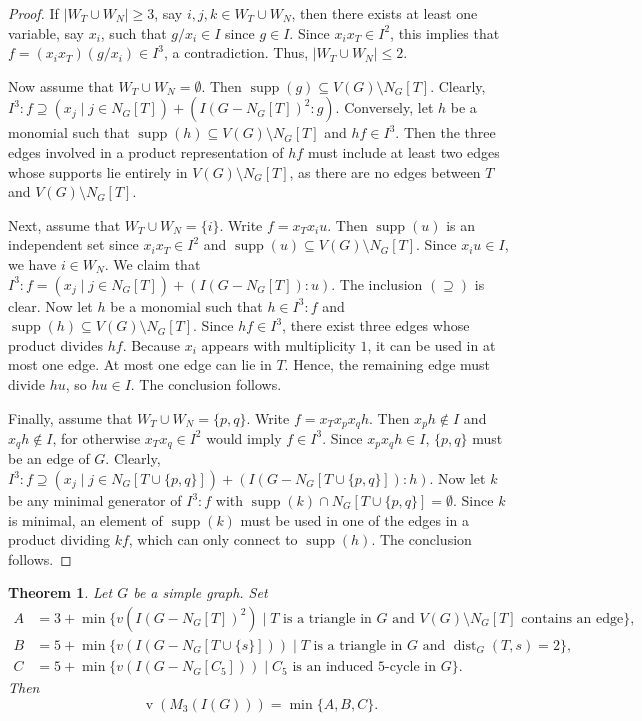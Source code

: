 \documentclass[12pt]{amsart}
\def\v{\operatorname{v}}
\newtheorem{theorem}[lemma]{Theorem}
\begin{document}
\begin{proof} 
If $|W_T \cup W_N| \ge 3$, say $i, j, k \in W_T \cup W_N$, then there exists at least one variable, say $x_i$, such that $g / x_i \in I$ since $g \in I$. Since $x_i x_T \in I^2$, this implies that $f = (x_i x_T) (g / x_i) \in I^3$, a contradiction. Thus, $|W_T \cup W_N| \le 2$.

Now assume that $W_T \cup W_N = \emptyset$. Then $\operatorname{supp}(g) \subseteq V(G) \setminus N_G[T]$. Clearly, $I^3 : f \supseteq (x_j \mid j \in N_G[T]) + (I(G - N_G[T])^2 : g)$. Conversely, let $h$ be a monomial such that $\operatorname{supp}(h) \subseteq V(G) \setminus N_G[T]$ and $h f \in I^3$. Then the three edges involved in a product representation of $h f$ must include at least two edges whose supports lie entirely in $V(G) \setminus N_G[T]$, as there are no edges between $T$ and $V(G) \setminus N_G[T]$.

Next, assume that $W_T \cup W_N = \{i\}$. Write $f = x_T x_i u$. Then $\operatorname{supp}(u)$ is an independent set since $x_i x_T \in I^2$ and $\operatorname{supp}(u) \subseteq V(G) \setminus N_G[T]$. Since $x_i u \in I$, we have $i \in W_N$. We claim that $I^3 : f = (x_j \mid j \in N_G[T]) + (I(G - N_G[T]) : u)$. The inclusion $(\supseteq)$ is clear. Now let $h$ be a monomial such that $h \in I^3 : f$ and $\operatorname{supp}(h) \subseteq V(G) \setminus N_G[T]$. Since $h f \in I^3$, there exist three edges whose product divides $h f$. Because $x_i$ appears with multiplicity $1$, it can be used in at most one edge. At most one edge can lie in $T$. Hence, the remaining edge must divide $h u$, so $h u \in I$. The conclusion follows.

Finally, assume that $W_T \cup W_N = \{p,q\}$. Write $f = x_T x_p x_q h$. Then $x_p h \notin I$ and $x_q h \notin I$, for otherwise $x_T x_q \in I^2$ would imply $f \in I^3$. Since $x_p x_q h \in I$, $\{p,q\}$ must be an edge of $G$. Clearly, $I^3 : f \supseteq (x_j \mid j \in N_G[T \cup \{p,q\}]) + (I(G - N_G[T \cup \{p,q\}]) : h)$. Now let $k$ be any minimal generator of $I^3 : f$ with $\operatorname{supp}(k) \cap N_G[T \cup \{p,q\}] = \emptyset$. Since $k$ is minimal, an element of $\operatorname{supp}(k)$ must be used in one of the edges in a product dividing $k f$, which can only connect to $\operatorname{supp}(h)$. The conclusion follows.
\end{proof}

\begin{theorem}\label{thm_v_3} 
Let $G$ be a simple graph. Set 
\begin{align*}
    A &= 3 + \min \{ v(I(G - N_G[T])^2) \mid T \text{ is a triangle in } G \text{ and } V(G) \setminus N_G[T] \text{ contains an edge} \}, \\
    B &= 5 + \min \{ v(I(G - N_G[T \cup \{s\}])) \mid T \text{ is a triangle in } G \text{ and } \operatorname{dist}_G(T,s) = 2 \}, \\
    C &= 5 + \min \{ v(I(G - N_G[C_5])) \mid C_5 \text{ is an induced } 5\text{-cycle in } G \}.
\end{align*}
Then 
$$\v(M_3(I(G))) = \min \{ A, B, C \}.$$
\end{theorem}
\end{document}
